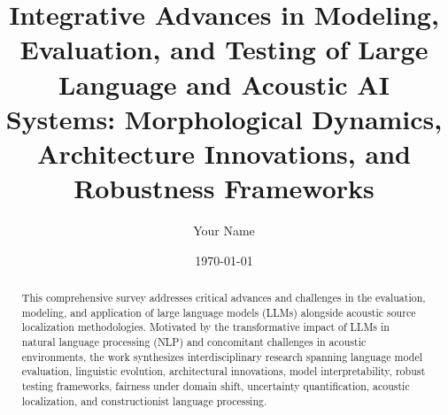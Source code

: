 \documentclass[11pt]{article}
\begin{document}
\author{Your Name}
\date{\today}

\title{\title{Integrative Advances in Modeling, Evaluation, and Testing of Large Language and Acoustic AI Systems: Morphological Dynamics, Architecture Innovations, and Robustness Frameworks}}
\maketitle

\begin{abstract}
This comprehensive survey addresses critical advances and challenges in the evaluation, modeling, and application of large language models (LLMs) alongside acoustic source localization methodologies. Motivated by the transformative impact of LLMs in natural language processing (NLP) and concomitant challenges in acoustic environments, the work synthesizes interdisciplinary research spanning language model evaluation, linguistic evolution, architectural innovations, model interpretability, robust testing frameworks, fairness under domain shift, uncertainty quantification, acoustic localization, and constructionist language processing.


\end{abstract}
\end{document}
